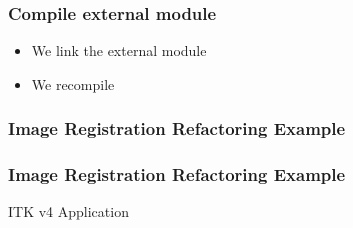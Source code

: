


\begin{frame}
\frametitle{Compile external module}
\begin{itemize}
\item We link the external module
\item We recompile
\end{itemize}
\end{frame}


\begin{frame}
\frametitle{Image Registration Refactoring Example}
\end{frame}

\begin{frame}
\frametitle{Image Registration Refactoring Example}
ITK v4 Application
\end{frame}



